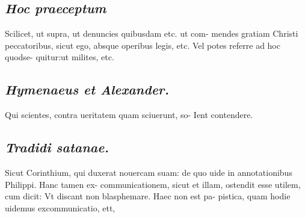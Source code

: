 \documentclass{article}
\begin{document}
\begin{pages}
\subsection*{\textit{Hoc praeceptum }}\pstart Scilicet, ut supra, ut denuncies quibusdam etc. ut com- mendes gratiam Christi peccatoribus, sicut ego, absque  operibus legis, etc. Vel potes referre ad hoc quodse- quitur:ut milites, etc.  \pend
{}
{}
\subsection*{\textit{Hymenaeus et Alexander. }}\pstart Qui scientes, contra ueritatem quam sciuerunt, so- Ient contendere.  \pend
{}
{}
\subsection*{\textit{Tradidi satanae. }}\pstart Sicut Corinthium, qui duxerat nouercam suam: de quo uide in annotationibus Philippi. Hanc tamen ex- communicationem, sicut et illam, ostendit esse utilem, cum dicit: Vt discant non blasphemare. Haec non est pa- pistica, quam hodie uidemus excommunicatio, ett,  \pend

\end{pages}
\end{document}
